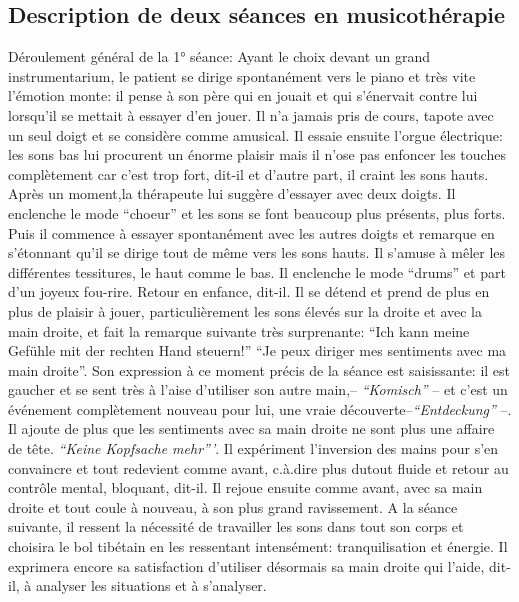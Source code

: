 \begin{enumerate}
 	\subsection{Description de deux  séances en musicothérapie}
 	Déroulement général de la 1° séance: 
Ayant le choix devant un grand instrumentarium,
        le patient se dirige spontanément vers le piano et très vite
        l'émotion monte: il pense à son père qui en jouait et qui
        s'énervait contre lui lorsqu'il se mettait  à essayer d'en
        jouer. Il n'a jamais pris de cours, tapote avec un seul doigt et se considère comme
        amusical. Il essaie ensuite l'orgue électrique: les sons bas
        lui procurent un énorme plaisir mais il n'ose pas enfoncer les touches
        complètement car c'est trop fort, dit-il et d'autre part, il craint les
        sons hauts.
        Après un moment,la thérapeute lui suggère d'essayer avec deux doigts.
        Il enclenche le mode ``choeur'' et les sons se font beaucoup
        plus présents, plus forts. Puis il commence à essayer spontanément
        avec les autres doigts et remarque en s'étonnant qu'il se
        dirige tout de même vers les sons
        hauts. Il s'amuse à mêler les différentes tessitures,
        le haut comme le bas.
        Il enclenche le mode ``drums'' et part d'un joyeux
        fou-rire. Retour en enfance, dit-il.
        Il se détend et prend de plus en plus de plaisir à jouer, particulièrement  les sons élevés
        sur la droite et avec la main droite, et fait
        la remarque suivante très surprenante:
        ``Ich kann meine Gefühle mit der rechten Hand steuern!''
        ``Je peux diriger mes sentiments avec ma main droite''.
 Son expression à ce moment précis de la séance est saisissante: il
        est gaucher et se sent très à l'aise d'utiliser son autre
        main,-- \textit{``Komisch''} -- et c'est un événement complètement nouveau pour lui, une vraie
        découverte--\textit{``Entdeckung''} --.
        Il ajoute de plus que les sentiments avec sa main
        droite ne sont plus une affaire de tête. \textit{``Keine
        Kopfsache mehr'''}. Il expériment l'inversion des mains pour s'en convaincre et tout redevient comme
        avant, c.à.dire plus dutout fluide et retour au contrôle
        mental, 
        bloquant, dit-il. Il rejoue ensuite comme avant, avec sa main droite et tout
        coule à nouveau, à son plus grand ravissement.
        A la séance suivante, il ressent la nécessité de travailler
        les sons dans tout son corps et choisira le bol tibétain en
        les 
        ressentant intensément: tranquilisation et
        énergie. Il
        exprimera encore sa satisfaction d'utiliser désormais  sa main
        droite qui l'aide, dit-il, à analyser les
        situations et à 
        s'analyser.


\end{enumerate}
